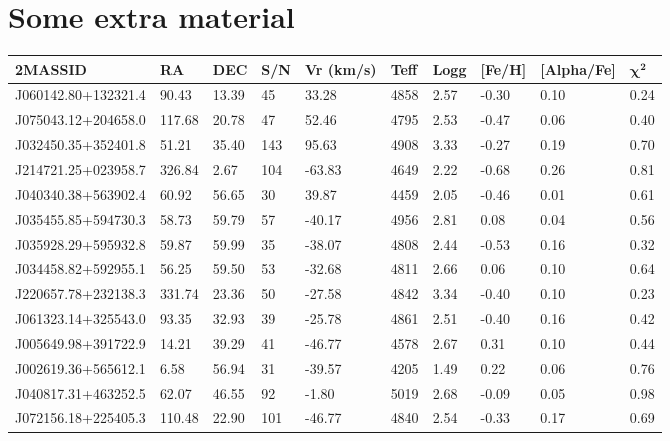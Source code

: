 \documentclass[a4paper,fleqn,usenatbib]{mnras}
\begin{document}


\appendix

\section{Some extra material}
\begin{table}
\centering
\begin{tabular}{llllllllll}
\hline
\textbf{2MASSID} & \textbf{RA} & \textbf{DEC} & \textbf{S/N} & \textbf{Vr (km/s)} & \textbf{Teff} & \textbf{Logg} & \textbf{[Fe/H]} & \textbf{[Alpha/Fe]} & {$\boldsymbol \chi^\textbf{2}$} \\ \hline
J060142.80+132321.4 & 90.43 & 13.39 & 45 & 33.28 & 4858 & 2.57 & -0.30 & 0.10 & 0.24 \\ \hline
J075043.12+204658.0 & 117.68 & 20.78 & 47 & 52.46 & 4795 & 2.53 & -0.47 & 0.06 & 0.40 \\ \hline
J032450.35+352401.8 & 51.21 & 35.40 & 143 & 95.63 & 4908 & 3.33 & -0.27 & 0.19 & 0.70 \\ \hline
J214721.25+023958.7 & 326.84 & 2.67 & 104 & -63.83 & 4649 & 2.22 & -0.68 & 0.26 & 0.81 \\ \hline
J040340.38+563902.4 & 60.92 & 56.65 & 30 & 39.87 & 4459 & 2.05 & -0.46 & 0.01 & 0.61 \\ \hline
J035455.85+594730.3 & 58.73 & 59.79 & 57 & -40.17 & 4956 & 2.81 & 0.08 & 0.04 & 0.56 \\ \hline
J035928.29+595932.8 & 59.87 & 59.99 & 35 & -38.07 & 4808 & 2.44 & -0.53 & 0.16 & 0.32 \\ \hline
J034458.82+592955.1 & 56.25 & 59.50 & 53 & -32.68 & 4811 & 2.66 & 0.06 & 0.10 & 0.64 \\ \hline
J220657.78+232138.3 & 331.74 & 23.36 & 50 & -27.58 & 4842 & 3.34 & -0.40 & 0.10 & 0.23 \\ \hline
J061323.14+325543.0 & 93.35 & 32.93 & 39 & -25.78 & 4861 & 2.51 & -0.40 & 0.16 & 0.42 \\ \hline
J005649.98+391722.9 & 14.21 & 39.29 & 41 & -46.77 & 4578 & 2.67 & 0.31 & 0.10 & 0.44 \\ \hline
J002619.36+565612.1 & 6.58 & 56.94 & 31 & -39.57 & 4205 & 1.49 & 0.22 & 0.06 & 0.76 \\ \hline
J040817.31+463252.5 & 62.07 & 46.55 & 92 & -1.80 & 5019 & 2.68 & -0.09 & 0.05 & 0.98 \\ \hline
J072156.18+225405.3 & 110.48 & 22.90 & 101 & -46.77 & 4840 & 2.54 & -0.33 & 0.17 & 0.69 \\ \hline

\end{tabular}
\end{table}
\end{document}
